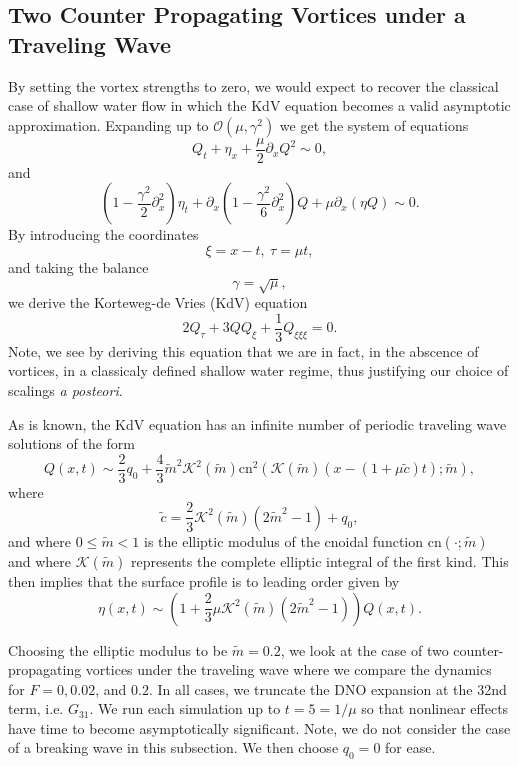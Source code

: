 \documentclass[a4paper,11pt]{article}
\newcommand{\p}{\partial}
\begin{document}
\subsection{Two Counter Propagating Vortices under a Traveling Wave}
By setting the vortex strengths to zero, we would expect to recover the classical 
case of shallow water flow in which the KdV equation becomes a valid asymptotic approximation.  
Expanding up to $\mathcal{O}(\mu,\gamma^{2})$ we get the system of equations 
\[
Q_{t} + \eta_{x} + \frac{\mu}{2}\p_{x}Q^{2} \sim 0, 
\]
and
\[
\left(1 - \frac{\gamma^{2}}{2}\p_{x}^{2}\right)\eta_{t} + \p_{x}\left(1-\frac{\gamma^{2}}{6}\p_{x}^{2} \right)Q + \mu \p_{x}(\eta Q) \sim 0.
\]
By introducing the coordinates
\[
\xi = x - t, ~ \tau = \mu t, 
\]
and taking the balance 
\[
\gamma = \sqrt{\mu}, 
\]
we derive the Korteweg-de Vries (KdV) equation
\[
2Q_{\tau} + 3QQ_{\xi} + \frac{1}{3} Q_{\xi\xi\xi} = 0.
\]
Note, we see by deriving this equation that we are in fact, in the abscence of vortices, in a classicaly defined shallow water regime, thus justifying our choice of scalings {\it a posteori}.  

As is known, the KdV equation has an infinite number of periodic traveling wave solutions of the form 
\begin{equation}
Q(x,t) \sim \frac{2}{3}q_{0} + \frac{4}{3} \tilde{m}^{2}\mathcal{K}^2(\tilde{m})\mbox{cn}^{2}\left(\mathcal{K}(\tilde{m}) \left( x- \left(1 + \mu \tilde{c}\right)t\right);\tilde{m}\right),
\label{kdvsolpot}
\end{equation}
where
\[
\tilde{c} = \frac{2}{3}\mathcal{K}^{2}(\tilde{m}) (2\tilde{m}^{2}-1)+q_{0},
\]
and where $0\leq \tilde{m}<1$ is the elliptic modulus of the cnoidal function $\mbox{cn}(\cdot;\tilde{m})$ and where $\mathcal{K}(\tilde{m})$ represents the complete elliptic integral of the first kind.  This then implies that the surface profile is to leading order given by 
\begin{equation}
\eta(x,t) \sim \left(1+\frac{2}{3}\mu \mathcal{K}^{2}(\tilde{m})(2\tilde{m}^{2}-1)\right)Q(x,t).
\label{kdvsolsurf}
\end{equation}

Choosing the elliptic modulus to be $\tilde{m}=0.2$, we look at the case of two counter-propagating vortices under the traveling wave where we compare the dynamics for $F=0, 0.02$, and $0.2$.  In all cases, we truncate the DNO expansion at the 32nd term, i.e. $G_{31}$.  We run each simulation up to $t=5=1/\mu$ so that nonlinear effects have time to become asymptotically significant.  Note, we do not consider the case of a breaking wave in this subsection.  We then choose $q_{0}=0$ for ease.        
\end{document}

